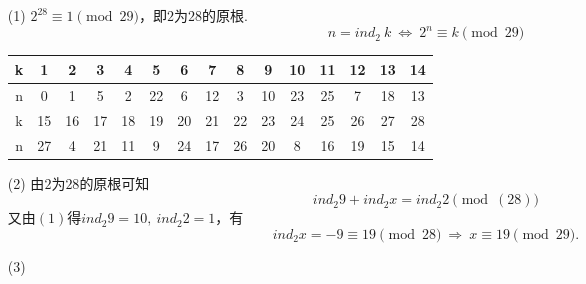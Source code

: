 \documentclass[UTF8]{ctexart}
\begin{document}
\subsection{}   %
\begin{enumerate}
    \item [(1)]$2^{28} \equiv 1\pmod{29}$，即$2$为$28$的原根.
    \[
        n = {ind}_{2}\  k\  \Leftrightarrow\  2^{n} \equiv k \pmod{29}
    \]
    \begin{table}[!ht]
        \centering
        \begin{tabular}{|c|c|c|c|c|c|c|c|c|c|c|c|c|c|c|}
        \hline
            k & 1 & 2 & 3 & 4 & 5 & 6 & 7 & 8 & 9 & 10 & 11 & 12 & 13 & 14  \\ \hline
            n & 0 & 1 & 5 & 2 & 22 & 6 & 12 & 3 & 10 & 23 & 25 & 7 & 18 & 13  \\ \hline
            k & 15 & 16 & 17 & 18 & 19 & 20 & 21 & 22 & 23 & 24 & 25 & 26 & 27 & 28  \\ \hline
            n & 27 & 4 & 21 & 11 & 9 & 24 & 17 & 26 & 20 & 8 & 16 & 19 & 15 & 14  \\ \hline
        \end{tabular}
    \end{table}
    
    \item [(2)]由$2$为$28$的原根可知
    \[
        {ind}_{2} 9 + {ind}_{2} x = {ind}_{2} 2 \pmod(28)    
    \]
    又由$(1)$得${ind}_{2} 9 = 10,\ {ind}_{2} 2=1$，有
    \[
        {ind}_{2} x = -9 \equiv 19 \pmod{28}    
        \ \Rightarrow\ 
        x\equiv 19 \pmod{29}.
    \]

    \item [(3)]
\end{enumerate}

\subsection{}   %


\subsection{}   %


\subsection{}   %


\subsection{}   %
\end{document}
